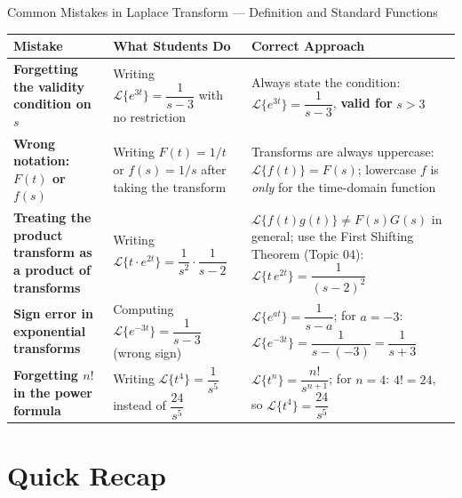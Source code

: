 \documentclass[12pt,a4paper]{article}
\begin{document}
\begin{mistakebox}{Common Mistakes in Laplace Transform --- Definition and Standard Functions}
\begin{tabular}{@{}>{\bfseries}p{3cm}p{5.5cm}p{5.5cm}@{}}
\toprule
\textbf{Mistake} & \textbf{What Students Do} & \textbf{Correct Approach} \\
\midrule
Forgetting the validity condition on $s$ &
Writing $\mathcal{L}\{e^{3t}\} = \dfrac{1}{s-3}$ with no restriction &
Always state the condition: $\mathcal{L}\{e^{3t}\} = \dfrac{1}{s-3}$, \textbf{valid for} $s > 3$ \\
\midrule
Wrong notation: $F(t)$ or $f(s)$ &
Writing $F(t) = 1/t$ or $f(s) = 1/s$ after taking the transform &
Transforms are always uppercase: $\mathcal{L}\{f(t)\} = F(s)$; lowercase $f$ is \emph{only} for the time-domain function \\
\midrule
Treating the product transform as a product of transforms &
Writing $\mathcal{L}\{t \cdot e^{2t}\} = \dfrac{1}{s^2} \cdot \dfrac{1}{s-2}$ &
$\mathcal{L}\{f(t)g(t)\} \neq F(s)G(s)$ in general; use the First Shifting Theorem (Topic 04): $\mathcal{L}\{t\,e^{2t}\} = \dfrac{1}{(s-2)^2}$ \\
\midrule
Sign error in exponential transforms &
Computing $\mathcal{L}\{e^{-3t}\} = \dfrac{1}{s-3}$ (wrong sign) &
$\mathcal{L}\{e^{at}\} = \dfrac{1}{s-a}$; for $a = -3$: $\mathcal{L}\{e^{-3t}\} = \dfrac{1}{s-(-3)} = \dfrac{1}{s+3}$ \\
\midrule
Forgetting $n!$ in the power formula &
Writing $\mathcal{L}\{t^4\} = \dfrac{1}{s^5}$ instead of $\dfrac{24}{s^5}$ &
$\mathcal{L}\{t^n\} = \dfrac{n!}{s^{n+1}}$; for $n=4$: $4! = 24$, so $\mathcal{L}\{t^4\} = \dfrac{24}{s^5}$ \\
\bottomrule
\end{tabular}
\end{mistakebox}

\section{Quick Recap}
\end{document}
